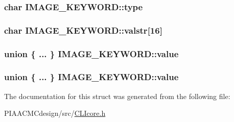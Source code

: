 \hypertarget{structIMAGE__KEYWORD_a93acc5dd5d573d8e91129b27332e4ef4}{
\subsubsection[{type}]{\setlength{\rightskip}{0pt plus 5cm}char I\+M\+A\+G\+E\+\_\+\+K\+E\+Y\+W\+O\+R\+D\+::type}}\label{structIMAGE__KEYWORD_a93acc5dd5d573d8e91129b27332e4ef4}
\hypertarget{structIMAGE__KEYWORD_a148ed6e2cddc70400b2692efbdd23280}{
\subsubsection[{valstr}]{\setlength{\rightskip}{0pt plus 5cm}char I\+M\+A\+G\+E\+\_\+\+K\+E\+Y\+W\+O\+R\+D\+::valstr\mbox{[}16\mbox{]}}}\label{structIMAGE__KEYWORD_a148ed6e2cddc70400b2692efbdd23280}
\hypertarget{structIMAGE__KEYWORD_a93da8b101ca9f8e620803c6e39316b0e}{
\subsubsection[{value}]{\setlength{\rightskip}{0pt plus 5cm}union \{ ... \}   I\+M\+A\+G\+E\+\_\+\+K\+E\+Y\+W\+O\+R\+D\+::value}}\label{structIMAGE__KEYWORD_a93da8b101ca9f8e620803c6e39316b0e}
\hypertarget{structIMAGE__KEYWORD_ae00a7165317bfd5266622cc3abae9b0f}{
\subsubsection[{value}]{\setlength{\rightskip}{0pt plus 5cm}union \{ ... \}   I\+M\+A\+G\+E\+\_\+\+K\+E\+Y\+W\+O\+R\+D\+::value}}\label{structIMAGE__KEYWORD_ae00a7165317bfd5266622cc3abae9b0f}


The documentation for this struct was generated from the following file\+:\begin{DoxyCompactItemize}
\item 
P\+I\+A\+A\+C\+M\+Cdesign/src/\hyperlink{PIAACMCdesign_2src_2CLIcore_8h}{C\+L\+Icore.\+h}\end{DoxyCompactItemize}
